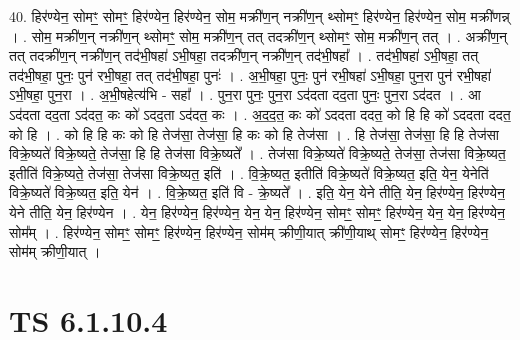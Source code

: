 \documentclass[17pt]{extarticle}
\begin{document}
40. हिर॑ण्येन॒ सोमꣳ॒॒ सोमꣳ॒॒ हिर॑ण्येन॒ हिर॑ण्येन॒ सोम॒ मक्री॑ण॒न् नक्री॑ण॒न् थ्सोमꣳ॒॒ हिर॑ण्येन॒ हिर॑ण्येन॒ सोम॒ मक्री॑णन्न् । . सोम॒ मक्री॑ण॒न् नक्री॑ण॒न् थ्सोमꣳ॒॒ सोम॒ मक्री॑ण॒न् तत् तदक्री॑ण॒न् थ्सोमꣳ॒॒ सोम॒ मक्री॑ण॒न् तत् । . अक्री॑ण॒न् तत् तदक्री॑ण॒न् नक्री॑ण॒न् तद॑भी॒षहा॑ ऽभी॒षहा॒ तदक्री॑ण॒न् नक्री॑ण॒न् तद॑भी॒षहा᳚ । . तद॑भी॒षहा॑ ऽभी॒षहा॒ तत् तद॑भी॒षहा॒ पुनः॒ पुन॑ रभी॒षहा॒ तत् तद॑भी॒षहा॒ पुनः॑ । . अ॒भी॒षहा॒ पुनः॒ पुन॑ रभी॒षहा॑ ऽभी॒षहा॒ पुन॒रा पुन॑ रभी॒षहा॑ ऽभी॒षहा॒ पुन॒रा । . अ॒भी॒षहेत्य॑भि - सहा᳚ । . पुन॒रा पुनः॒ पुन॒रा ऽद॑दता दद॒ता पुनः॒ पुन॒रा ऽद॑दत । . आ ऽद॑दता दद॒ता ऽद॑दत॒ कः को॑ ऽदद॒ता ऽद॑दत॒ कः । . अ॒द॒द॒त॒ कः को॑ ऽददता ददत॒ को हि हि को॑ ऽददता ददत॒ को हि । . को हि हि कः को हि तेज॑सा॒ तेज॑सा॒ हि कः को हि तेज॑सा । . हि तेज॑सा॒ तेज॑सा॒ हि हि तेज॑सा विक्रे॒ष्यते॑ विक्रे॒ष्यते॒ तेज॑सा॒ हि हि तेज॑सा विक्रे॒ष्यते᳚ । . तेज॑सा विक्रे॒ष्यते॑ विक्रे॒ष्यते॒ तेज॑सा॒ तेज॑सा विक्रे॒ष्यत॒ इतीति॑ विक्रे॒ष्यते॒ तेज॑सा॒ तेज॑सा विक्रे॒ष्यत॒ इति॑ । . वि॒क्रे॒ष्यत॒ इतीति॑ विक्रे॒ष्यते॑ विक्रे॒ष्यत॒ इति॒ येन॒ येनेति॑ विक्रे॒ष्यते॑ विक्रे॒ष्यत॒ इति॒ येन॑ । . वि॒क्रे॒ष्यत॒ इति॑ वि - क्रे॒ष्यते᳚ । . इति॒ येन॒ येने तीति॒ येन॒ हिर॑ण्येन॒ हिर॑ण्येन॒ येने तीति॒ येन॒ हिर॑ण्येन । . येन॒ हिर॑ण्येन॒ हिर॑ण्येन॒ येन॒ येन॒ हिर॑ण्येन॒ सोमꣳ॒॒ सोमꣳ॒॒ हिर॑ण्येन॒ येन॒ येन॒ हिर॑ण्येन॒ सोम᳚म् । . हिर॑ण्येन॒ सोमꣳ॒॒ सोमꣳ॒॒ हिर॑ण्येन॒ हिर॑ण्येन॒ सोम॑म् क्रीणी॒यात् क्री॑णी॒याथ् सोमꣳ॒॒ हिर॑ण्येन॒ हिर॑ण्येन॒ सोम॑म् क्रीणी॒यात् । \newline
\pagebreak
{}

\section{ TS 6.1.10.4 }
\end{document}
